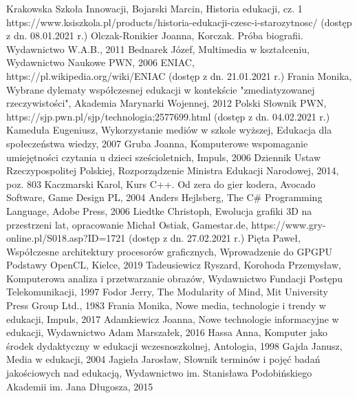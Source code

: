 \documentclass{article}
\begin{document}
	\newpage
	\renewcommand\refname{\section*{Bibliografia}}
	\begin{thebibliography}{30}\linespread{1}\normalsize{
			Krakowska Szkoła Innowacji, Bojarski Marcin, Historia edukacji, cz. 1  https://www.ksiszkola.pl/products/historia-edukacji-czesc-i-starozytnosc/ (dostęp z dn. 08.01.2021 r.)
			Olczak-Ronikier Joanna, Korczak. Próba biografii. Wydawnictwo W.A.B., 2011
			Bednarek Józef, Multimedia w kształceniu, Wydawnictwo Naukowe PWN, 2006
			ENIAC, https://pl.wikipedia.org/wiki/ENIAC (dostęp z dn. 21.01.2021 r.)
			Frania Monika, Wybrane dylematy współczesnej edukacji w kontekście "zmediatyzowanej rzeczywistości", Akademia Marynarki Wojennej, 2012
			Polski Słownik PWN, https://sjp.pwn.pl/sjp/technologia;2577699.html (dostęp z dn. 04.02.2021 r.)
			Kameduła Eugeniusz, Wykorzystanie mediów w szkole wyższej, Edukacja dla społeczeństwa wiedzy, 2007
			Gruba Joanna, Komputerowe wspomaganie umiejętności czytania u dzieci sześcioletnich, Impuls, 2006
			Dziennik Ustaw Rzeczypospolitej Polskiej, Rozporządzenie Ministra Edukacji Narodowej, 2014, poz. 803
			Kaczmarski Karol, Kurs C++. Od zera do gier kodera, Avocado Software, Game Design PL, 2004
			Anders Hejlsberg, The C# Programming Language, Adobe Press, 2006
			Liedtke Christoph, Ewolucja grafiki 3D na przestrzeni lat, opracowanie Michał Ostiak, Gamestar.de, https://www.gry-online.pl/S018.asp?ID=1721 (dostęp z dn. 27.02.2021 r.)
			Pięta Paweł, Współczesne architektury procesorów graficznych, Wprowadzenie do GPGPU Podstawy OpenCL, Kielce, 2019
			Tadeusiewicz Ryszard, Korohoda Przemysław, Komputerowa analiza i przetwarzanie obrazów, Wydawnictwo Fundacji Postępu Telekomunikacji, 1997
			Fodor Jerry, The Modularity of Mind, Mit University Press Group Ltd., 1983
			Frania Monika, Nowe media, technologie i trendy w edukacji, Impuls, 2017
			Adamkiewicz Joanna, Nowe technologie informacyjne w edukacji, Wydawnictwo Adam Marszałek, 2016
			Hassa Anna, Komputer jako środek dydaktyczny w edukacji wczesnoszkolnej, Antologia, 1998
			Gajda Janusz, Media w edukacji, 2004
			Jagieła Jarosław, Słownik terminów i pojęć badań jakościowych nad edukacją, Wydawnictwo im. Stanisława Podobińskiego Akademii im. Jana Długosza, 2015
		}
	\end{thebibliography}
	\newpage
	\renewcommand{\listfigurename}{Spis rysunków}
	\listoffigures
	\newpage
	
	\newpage
	\renewcommand\lstlistlistingname{Spis listingów}
	\begin{lstlistoflistings}
	\end{lstlistoflistings}
	\newpage
	
	\newpage
	\renewcommand\listtablename{Spis tabel}
	\begin{listoftables}
	\end{listoftables}
	\newpage
	
	
\end{document}
